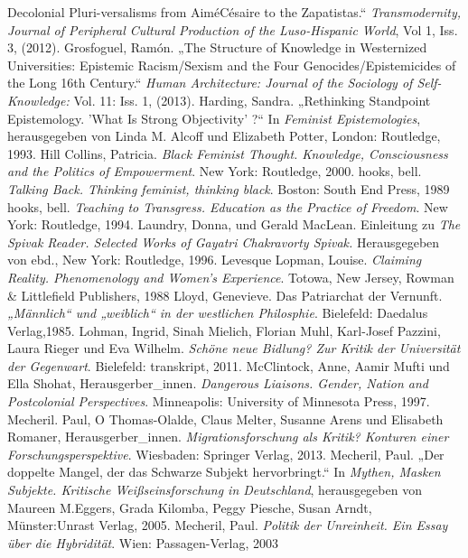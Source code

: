 \documentclass[11pt]{article}
\begin{document}
\begin{thebibliography}{100}
  Decolonial Pluri-versalisms from AiméCésaire to the Zapatistas.“ \emph{Transmodernity, Journal of Peripheral Cultural Production of the Luso-Hispanic World}, Vol 1, Iss. 3, (2012). 
   Grosfoguel, Ramón. „The Structure of Knowledge in Westernized Universities: Epistemic
Racism/Sexism and the Four Genocides/Epistemicides of the Long 16th Century.“
\emph{Human Architecture: Journal of the Sociology of Self-Knowledge:} Vol. 11: Iss. 1, (2013). 
 Harding, Sandra. „Rethinking Standpoint Epistemology. 'What
Is Strong Objectivity' ?“ In \emph{Feminist Epistemologies}, herausgegeben von Linda M. Alcoff und Elizabeth Potter,  London: Routledge, 1993.
 Hill Collins, Patricia. \emph{Black Feminist Thought.
Knowledge, Consciousness and the Politics of Empowerment}. New York: Routledge, 2000.
 hooks, bell. \emph{Talking Back. Thinking feminist, thinking black}. Boston: South End Press, 1989
 hooks, bell. \emph{Teaching to Transgress. Education as the Practice of Freedom}. New York: Routledge, 1994.
 Laundry, Donna, und Gerald MacLean. Einleitung zu \emph{The Spivak Reader. Selected Works of
Gayatri Chakravorty Spivak.} Herausgegeben von ebd., New York: Routledge, 1996.
 Levesque Lopman, Louise. \emph{Claiming Reality. Phenomenology and
Women's Experience}. Totowa, New Jersey, Rowman &  Littlefield Publishers, 1988
 Lloyd, Genevieve. Das Patriarchat der Vernunft. \emph{„Männlich“ und „weiblich“ in der westlichen
Philosphie}. Bielefeld: Daedalus Verlag,1985. 
 Lohman, Ingrid,  Sinah Mielich, Florian Muhl, Karl-Josef Pazzini, Laura Rieger und Eva Wilhelm. 
\emph{Schöne neue Bidlung? Zur Kritik der Universität der Gegenwart}. Bielefeld: transkript, 2011.
 McClintock, Anne, Aamir Mufti und Ella Shohat,
Herausgerber\_innen. \emph{Dangerous Liaisons.
Gender, Nation and Postcolonial Perspectives}. Minneapolis: University of Minnesota Press, 1997.
 Mecheril. Paul, O Thomas-Olalde, Claus Melter, Susanne Arens und Elisabeth Romaner,
Herausgerber\_innen. \emph{Migrationsforschung als Kritik? Konturen einer
Forschungsperspektive}. Wiesbaden: Springer Verlag, 2013.
 Mecheril, Paul. „Der doppelte Mangel, der das Schwarze Subjekt hervorbringt.“ In \textit{Mythen, Masken Subjekte. Kritische Weißseinsforschung in Deutschland}, herausgegeben von Maureen M.Eggers, Grada Kilomba, Peggy Piesche, Susan Arndt, Münster:Unrast Verlag, 2005.
 Mecheril, Paul. \emph{Politik der Unreinheit. Ein Essay über die Hybridität}. Wien: Passagen-Verlag, 2003

\end{thebibliography}
\end{document}
